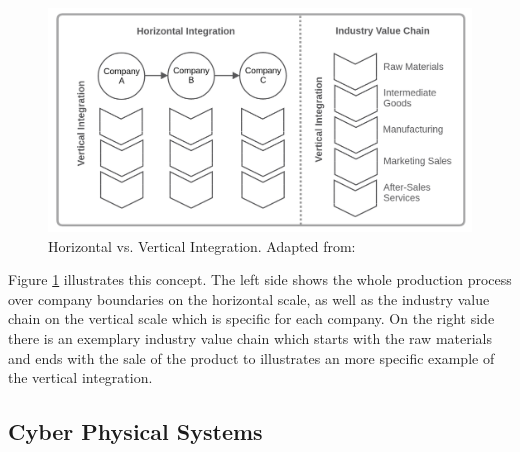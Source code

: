 \begin{figure}
    \centering
    \includegraphics[width=\textwidth]{resources/images/vertical_horizontal_integration.png}
    \caption[Horizontal vs. Vertical Integration]{Horizontal vs. Vertical Integration. Adapted from: \cite{Jur2013}}
    \label{fig:vertical_horizontal_integration}
\end{figure}

Figure \ref{fig:vertical_horizontal_integration} illustrates this concept.
The left side shows the whole production process over company boundaries on the horizontal scale, as well as the industry value chain on the vertical scale which is specific for each company.
On the right side there is an exemplary industry value chain which starts with the raw materials and ends with the sale of the product to illustrates an more specific example of the vertical integration.






\subsection{Cyber Physical Systems}

